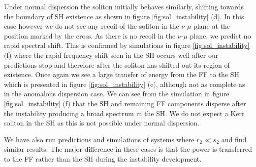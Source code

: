 \documentclass[reprint,
 amsmath,amssymb,
 pra,
]{revtex4-1}
\begin{document}
Under normal dispersion the soliton initially behaves similarly, shifting towards the boundary of SH existence as shown in figure \ref{fig:sol_instability} (d). In this case however we do not see any recoil of the soliton in the $\nu$-$\mu$ plane at the position marked by the cross. As there is no recoil in the $\nu$-$\mu$ plane, we predict no rapid spectral shift. This is confirmed by simulations in figure \ref{fig:sol_instability} (f) where the rapid frequency shift seen in the SH occurs well after our predictions stop and therefore after the soliton has shifted out its region of existence. Once again we see a large transfer of energy from the FF to the SH which is presented in figure \ref{fig:sol_instability} (e), although not as complete as in the anomalous dispersion case. We can see from the simulation in figure \ref{fig:sol_instability} (f) that the SH and remaining FF components disperse after the instability producing a broad spectrum in the SH. We do not expect a Kerr soliton in the SH as this is not possible under normal dispersion.

We have also run predictions and simulations of systems where $r_2 \ll s_2$ and find similar results. The major difference in these cases is that the power is transferred to the FF rather than the SH during the instability development. 
\end{document}
